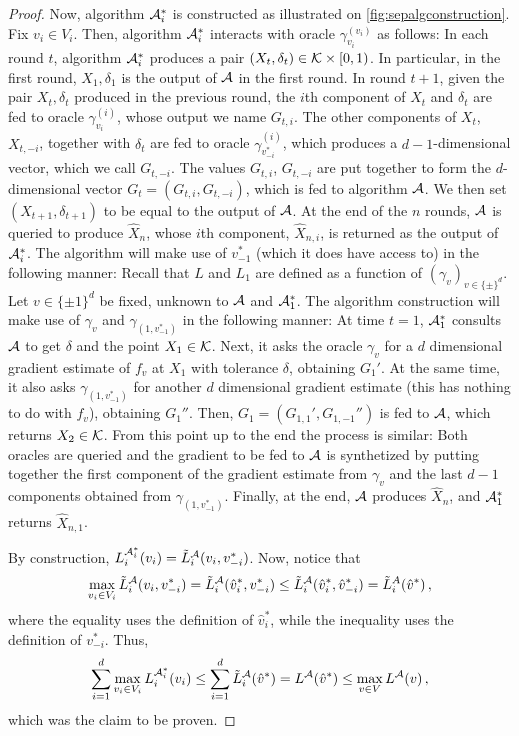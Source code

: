 \begin{proof}
Now, algorithm $\mathcal{A}_i^*$ is constructed as illustrated on \cref{fig:sepalgconstruction}.
Fix $v_i\in V_i$. Then, algorithm $\mathcal{A}_i^*$ interacts with oracle $\gamma_{v_i}^{(v_i)}$ as follows:
In each round $t$, algorithm $\mathcal{A}_i^*$ produces a pair $(X_t,\delta_t) \in \mathcal{K} \times [0,1)$. 
In particular, in the first round, $X_1,\delta_1$ is the output of $\mathcal{A}$ in the first round.
In round $t+1$, given the pair $X_t,\delta_t$ produced in the previous round,
the $i$th component of $X_t$ and $\delta_t$ are fed to oracle $\gamma_{v_i}^{(i)}$, 
whose output we name $G_{t,i}$. 
The other components of $X_t$, $X_{t,-i}$, together with $\delta_t$ are fed to
oracle $\gamma_{v^*_{-i}}^{(i)}$, 
which produces a $d-1$-dimensional vector, which we call $G_{t,-i}$. 
The values $G_{t,i}$, $G_{t,-i}$ are put together to form the $d$-dimensional vector 
$G_t = (G_{t,i},G_{t,-i})$, which is fed to algorithm $\mathcal{A}$.
We then set $(X_{t+1},\delta_{t+1})$ to be equal to the output of $\mathcal{A}$. 
At the end of the $n$ rounds, $\mathcal{A}$ is queried to produce $\hat{X}_n$, 
whose $i$th component, $\hat{X}_{n,i}$, 
is returned as the output of $\mathcal{A}_i^*$.
The algorithm will make use of $v_{-1}^*$ (which it does have access to) in the following manner:
Recall that $L$ and $L_1$ are defined as a function of $(\gamma_v)_{v\in \{\pm\}^d}$.
Let $v\in \{\pm 1\}^d$ be fixed, unknown to $\mathcal{A}$ and $\mathcal{A}_1^*$. 
The algorithm construction will make use of $\gamma_v$ and $\gamma_{(1,v_{-1}^*)}$ in the following manner:
At time $t=1$, $\mathcal{A}_1^*$ consults $\mathcal{A}$ to get $\delta$ and the point $X_1\in \mathcal{K}$.
Next, it asks the oracle $\gamma_v$ for a $d$ dimensional gradient estimate of $f_v$ at $X_1$ with tolerance $\delta$,
obtaining $G_1'$.
At the same time, it also asks $\gamma_{(1,v_{-1}^*)}$ for another $d$ dimensional gradient estimate (this has nothing to do with $f_v$), obtaining $G_1''$.
Then, $G_1 = (G_{1,1}',G_{1,-1}'')$ is fed to $\mathcal{A}$, which returns $X_2\in \mathcal{K}$. From this point up to the end the process is similar: Both oracles are queried and the gradient to be fed to $\mathcal{A}$ is synthetized by putting together the first component of the gradient estimate from $\gamma_v$ and the last $d-1$ components obtained from $\gamma_{(1,v_{-1}^*)}$.
Finally, at the end, $\mathcal{A}$ produces $\hat{X}_n$, and $\mathcal{A}_1^*$ returns $\hat{X}_{n,1}$.
\fi

By construction, $L^{\mathcal{A}_i^*}_i(v_i) = \tilde{L}_i^{\mathcal{A}}(v_i,v_{-i}^*)$.
Now, notice that 
\begin{align*}
\max_{v_i\in V_i} \tilde{L}^{\mathcal{A}}_i(v_i,v^*_{-i}) 
=  \tilde{L}^{\mathcal{A}}_i(\hat{v}_i^*,v^*_{-i}) 
\le  \tilde{L}^{\mathcal{A}}_i(\hat{v}_i^*,\hat{v}^*_{-i})  = \tilde{L}^{A}_i(\hat{v}^*)\,,
\end{align*}
where the equality uses the definition of $\hat{v}_i^*$,
while the inequality uses the definition of $v^*_{-i}$.
Thus,
\begin{align*}
\sum_{i=1}^d \max_{v_i\in V_i} L^{\mathcal{A}_i^*}_i(v_i)
 \le \sum_{i=1}^d  \tilde{L}^{\mathcal{A}}_i(\hat{v}^*) 
 = L^{\mathcal{A}}(\hat{v}^*) \le \max_{v\in V } L^{\mathcal{A}}(v)\,,
\end{align*}
which was the claim to be proven.
\end{proof}

